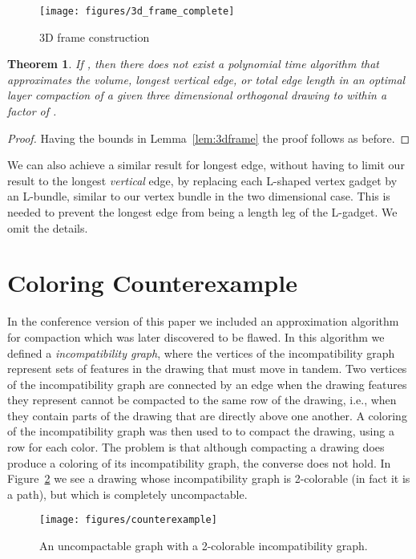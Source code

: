 \documentclass[12pt]{article}
\newtheorem{theorem}{Theorem}
\theoremstyle{definitions}
\begin{document}
\begin{figure}[b!]
\centering
\texttt{[image: figures/3d\_frame\_complete]}
\caption{3D frame construction
\label{fig:3dframe}}
\end{figure}
\newpage
\begin{theorem}
If , then there does not exist a polynomial time algorithm that
approximates the volume, longest vertical edge, or total edge length 
in an optimal layer compaction of a given three dimensional orthogonal drawing 
to within a factor of .
\end{theorem}
\begin{proof}
Having the bounds in Lemma~\ref{lem:3dframe} the proof follows as before.
\end{proof}

We can also achieve a similar result for longest edge, without having to limit
our result to the longest \emph{vertical} edge, by replacing each L-shaped vertex gadget
by an L-bundle, similar to our vertex bundle in the two dimensional case. This is needed to prevent the longest edge from being a  length leg of the L-gadget. We
omit the details.

\section{Coloring Counterexample}
In the conference version of this paper we included an approximation algorithm for compaction which was later discovered to be flawed. In this algorithm we defined a \emph{incompatibility graph}, where the vertices of the incompatibility graph represent sets of features in the drawing that must move in tandem. Two vertices of the incompatibility graph are connected by an edge when the drawing features they represent cannot be compacted to the same row of the drawing, i.e., when they contain parts of the drawing that are directly above one another. A coloring of the incompatibility graph was then used to to compact the drawing, using a row for each color. The problem is that although compacting a drawing does produce a coloring of its incompatibility graph, the converse does not hold. In Figure~\ref{fig:cexamp} we see a drawing whose incompatibility graph is 2-colorable (in fact it is a path), but which is completely uncompactable.

\begin{figure}[ht!]
\centering
\texttt{[image: figures/counterexample]}
\caption{An uncompactable graph with a 2-colorable incompatibility graph.}
\label{fig:cexamp}
\end{figure}
\end{document}
